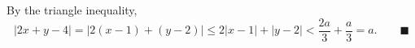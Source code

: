 By the triangle inequality,
\[|2x+y-4|=|2(x-1)+(y-2)|\le2|x-1|+|y-2|<\dfrac{2a}3+\dfrac a3=a. \qquad\blacksquare\]
